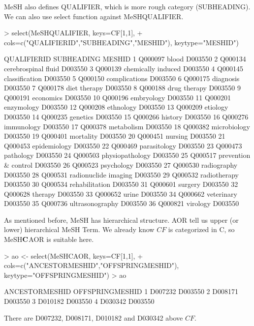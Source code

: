 \documentclass[11pt]{article}
\begin{document}
MeSH also defines QUALIFIER, which is more rough category (SUBHEADING). We can also use select function against MeSHQUALIFIER.
\begin{center}
\begin{Schunk}
\begin{Sinput}
> select(MeSHQUALIFIER, keys=CF[1,1], 
+        cols=c("QUALIFIERID","SUBHEADING","MESHID"), keytype="MESHID")
\end{Sinput}
\begin{Soutput}
   QUALIFIERID           SUBHEADING  MESHID
1      Q000097                blood D003550
2      Q000134  cerebrospinal fluid D003550
3      Q000139   chemically induced D003550
4      Q000145       classification D003550
5      Q000150        complications D003550
6      Q000175            diagnosis D003550
7      Q000178         diet therapy D003550
8      Q000188         drug therapy D003550
9      Q000191            economics D003550
10     Q000196           embryology D003550
11     Q000201           enzymology D003550
12     Q000208            ethnology D003550
13     Q000209             etiology D003550
14     Q000235             genetics D003550
15     Q000266              history D003550
16     Q000276           immunology D003550
17     Q000378           metabolism D003550
18     Q000382         microbiology D003550
19     Q000401            mortality D003550
20     Q000451              nursing D003550
21     Q000453         epidemiology D003550
22     Q000469         parasitology D003550
23     Q000473            pathology D003550
24     Q000503      physiopathology D003550
25     Q000517 prevention & control D003550
26     Q000523           psychology D003550
27     Q000530          radiography D003550
28     Q000531 radionuclide imaging D003550
29     Q000532         radiotherapy D003550
30     Q000534       rehabilitation D003550
31     Q000601              surgery D003550
32     Q000628              therapy D003550
33     Q000652                urine D003550
34     Q000662           veterinary D003550
35     Q000736      ultrasonography D003550
36     Q000821             virology D003550
\end{Soutput}
\end{Schunk}
\end{center}


As mentioned before, MeSH has hierarchical structure. AOR tell us upper (or lower) hierarchical MeSH Term. We already know $CF$ is categorized in C, so MeSH$\bf{C}$AOR is suitable here.
\begin{center}
\begin{Schunk}
\begin{Sinput}
> ao <- select(MeSHCAOR, keys=CF[1,1], 
+        cols=c("ANCESTORMESHID","OFFSPRINGMESHID"), keytype="OFFSPRINGMESHID")
> ao
\end{Sinput}
\begin{Soutput}
  ANCESTORMESHID OFFSPRINGMESHID
1        D007232         D003550
2        D008171         D003550
3        D010182         D003550
4        D030342         D003550
\end{Soutput}
\end{Schunk}
\end{center}
There are D007232, D008171, D010182 and D030342 above $CF$.\\
\end{document}
